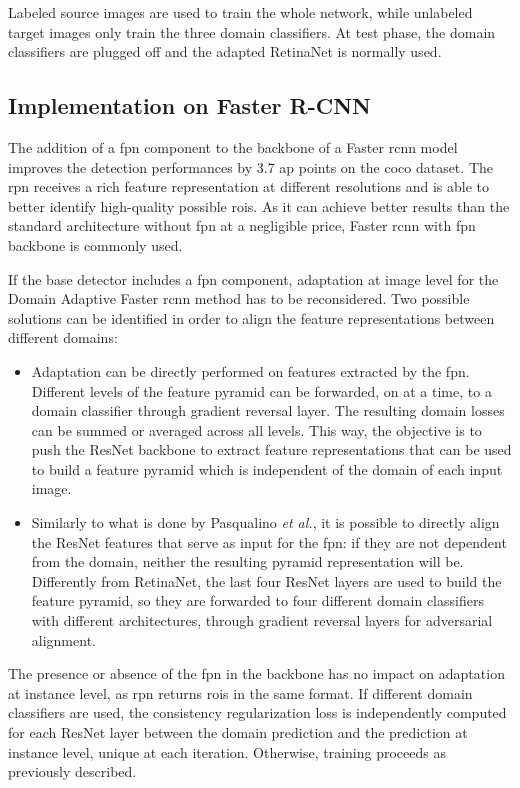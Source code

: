\documentclass[%
    corpo=12pt,
    twoside,
    stile=classica,   
    tipotesi=magistrale,
    evenboxes,
    english
]{toptesi}
\begin{document}

Labeled source images are used to train the whole network, while unlabeled target images only train the three domain classifiers. At test phase, the domain classifiers are plugged off and the adapted RetinaNet is normally used.

\subsection{Implementation on Faster R-CNN}
The addition of a \gls{fpn} component to the backbone of a Faster \gls{rcnn} model improves the detection performances by 3.7 \gls{ap} points on the \gls{coco} dataset\cite{lin2017feature}. The \gls{rpn} receives a rich feature representation at different resolutions and is able to better identify high-quality possible \glspl{roi}. As it can achieve better results than the standard architecture without \gls{fpn} at a negligible price, Faster \gls{rcnn} with \gls{fpn} backbone is commonly used. 

If the base detector includes a \gls{fpn} component, adaptation at image level for the Domain Adaptive Faster \gls{rcnn} method has to be reconsidered. Two possible solutions can be identified in order to align the feature representations between different domains:
\begin{itemize}
	\item Adaptation can be directly performed on features extracted by the \gls{fpn}. Different levels of the feature pyramid can be forwarded, on at a time, to a domain classifier through gradient reversal layer. The resulting domain losses can be summed or averaged across all levels. This way, the objective is to push the ResNet backbone to extract feature representations that can be used to build a feature pyramid which is independent of the domain of each input image.
	\item Similarly to what is done by Pasqualino \textit{et al.}\cite{pasqualino2020unsupervised}, it is possible to directly align the ResNet features that serve as input for the \gls{fpn}: if they are not dependent from the domain, neither the resulting pyramid representation will be. Differently from RetinaNet, the last four ResNet layers are used to build the feature pyramid, so they are forwarded to four different domain classifiers with different architectures, through gradient reversal layers for adversarial alignment.
\end{itemize}
The presence or absence of the \gls{fpn} in the backbone has no impact on adaptation at instance level, as \gls{rpn} returns \glspl{roi} in the same format. If different domain classifiers are used, the consistency regularization loss is independently computed for each ResNet layer between the domain prediction and the prediction at instance level, unique at each iteration. Otherwise, training proceeds as previously described.
\end{document}

